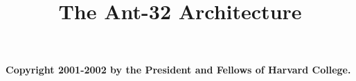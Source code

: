 \documentclass[11pt]{book}
\title{\Huge\bf The Ant-32 Architecture
		\linebreak
		{\bf \antVersion}
		\linebreak
		
	}
\begin{document}
\frontmatter
\maketitle

{\bf Copyright 2001-2002 by the President and Fellows of Harvard College. }

\tableofcontents

\mainmatter







\end{document}
